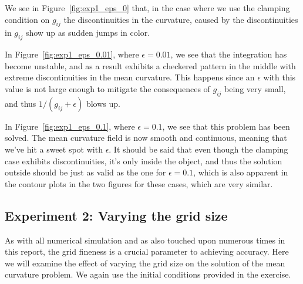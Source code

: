 \documentclass[acmtog]{acmart}
\begin{document}
We see in Figure~\ref{fig:exp1_eps_0} that, in the case where we use the
clamping condition on $g_{ij}$ the discontinuities in the curvature, caused by
the discontinuities in $g_{ij}$ show up as sudden jumps in color.

In Figure~\ref{fig:exp1_eps_0.01}, where $\epsilon = 0.01$, we see that the
integration has become unstable, and as a result exhibits a checkered pattern
in the middle with extreme discontinuities in the mean curvature. This happens
since an $\epsilon$ with this value is not large enough to mitigate the
consequences of $g_{ij}$ being very small, and thus $1/(g_{ij} + \epsilon)$
blows up.

In Figure~\ref{fig:exp1_eps_0.1}, where $\epsilon = 0.1$, we see that this
problem has been solved. The mean curvature field is now smooth and continuous,
meaning that we've hit a sweet spot with $\epsilon$. It should be said that
even though the clamping case exhibits discontinuities, it's only inside the
object, and thus the solution outside should be just as valid as the one for
$\epsilon = 0.1$, which is also apparent in the contour plots in the two
figures for these cases, which are very similar.

\subsection{Experiment 2: Varying the grid size}
As with all numerical simulation and as also touched upon numerous times in
this report, the grid fineness is a crucial parameter to achieving accuracy.
Here we will examine the effect of varying the grid size on the solution of the
mean curvature problem. We again use the initial conditions provided in the
exercise.
\end{document}
